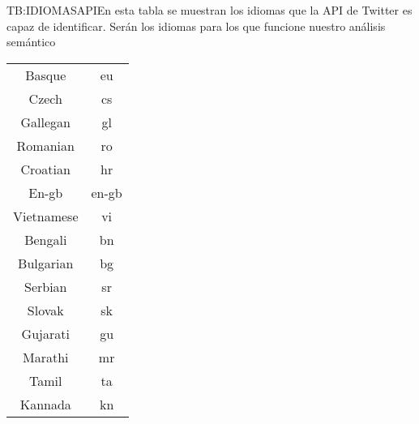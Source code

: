 \begin{table}[Idiomas soportados por la API de Twitter]{TB:IDIOMASAPI}{En esta tabla se muestran los idiomas que la API de Twitter es capaz de identificar. Serán los idiomas para los que funcione nuestro análisis semántico}
{\begin{tabular}{|c|c|}
		Basque & eu\\ 
		Czech & cs\\ 
		Gallegan & gl\\ 
		Romanian & ro\\ 
		Croatian & hr\\ 
		En-gb & en-gb\\ 
		Vietnamese & vi\\ 
		Bengali & bn\\ 
		Bulgarian & bg\\ 
		Serbian & sr\\ 
		Slovak & sk\\ 
		Gujarati & gu\\ 
		Marathi & mr\\ 
		Tamil & ta\\ 
		Kannada & kn\\
		\hline \hline
		\hline
		\end{tabular}
	}

\end{table}

